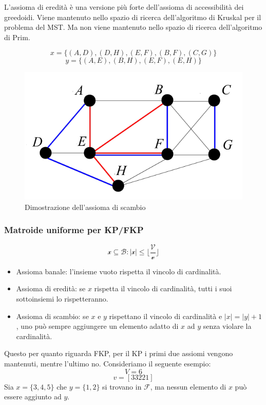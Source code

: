 \documentclass{article}
\begin{document}
    L'assioma di eredità è una versione più forte dell'assioma di accessibilità dei
    greedoidi. Viene mantenuto nello spazio di ricerca dell'algoritmo di Kruskal per il problema
    del MST. Ma non viene mantenuto nello spazio di ricerca dell'algoritmo di Prim.

    $$x=\{(A,D),(D,H),(E,F),(B,F),(C,G)\}$$
    $$y=\{(A,E),(B,H),(E,F),(E,H)\}$$
    \begin{figure}[H]
        \centering
        \includegraphics[scale=0.5]{images/matr_mst.png}
        \caption{Dimostrazione dell'assioma di scambio}
    \end{figure}

    \subsubsection{Matroide uniforme per KP/FKP}
    $$\mathcal{x\subseteq B:|x|\leq\lfloor\frac{V}{v}\rfloor}$$
    \begin{itemize}
        \item Assioma banale: l'insieme vuoto rispetta il vincolo di cardinalità.
        \item Assioma di eredità: se $x$ rispetta il vincolo di cardinalità, tutti
              i suoi sottoinsiemi lo rispetteranno.
        \item Assioma di scambio: se $x$ e $y$ rispettano il vincolo di cardinalità e
              $|x|=|y|+1$, uno può sempre aggiungere un elemento adatto di $x$ ad $y$ senza violare
              la cardinalità.
    \end{itemize}
    Questo per quanto riguarda FKP, per il KP i primi due assiomi vengono mantenuti, mentre l'ultimo
    no.
    Consideriamo il seguente esempio:
    $$V=6$$
    $$v=[3 3 2 2 1]$$
    Sia $x=\{3,4,5\}$ che $y=\{1,2\}$ si trovano in $\mathcal{F}$, ma nessun elemento di $x$ può
    essere aggiunto ad $y$.
\end{document}
